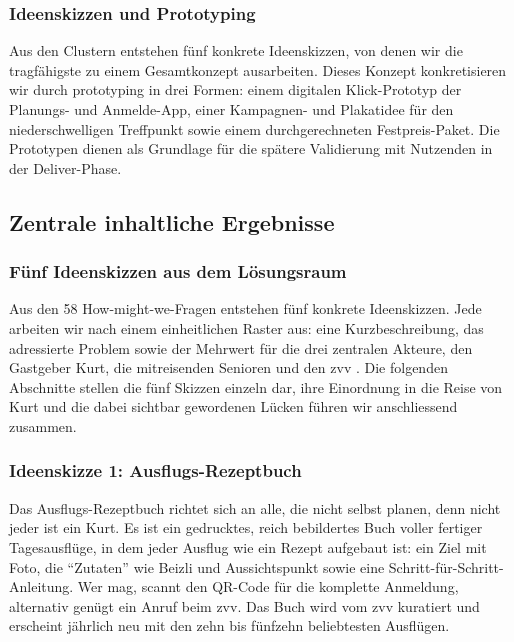 \subsubsection{Ideenskizzen und Prototyping}
Aus den Clustern entstehen fünf konkrete Ideenskizzen, von denen wir die tragfähigste zu einem Gesamtkonzept ausarbeiten. Dieses Konzept konkretisieren wir durch \gls{prototyping} in drei Formen: einem digitalen Klick-Prototyp der Planungs- und Anmelde-App, einer Kampagnen- und Plakatidee für den niederschwelligen Treffpunkt sowie einem durchgerechneten Festpreis-Paket. Die Prototypen dienen als Grundlage für die spätere Validierung mit Nutzenden in der Deliver-Phase.

\newpage
\subsection{Zentrale inhaltliche Ergebnisse}

\subsubsection{Fünf Ideenskizzen aus dem Lösungsraum}
Aus den 58 How-might-we-Fragen entstehen fünf konkrete Ideenskizzen. Jede arbeiten wir nach einem einheitlichen Raster aus: eine Kurzbeschreibung, das adressierte Problem sowie der Mehrwert für die drei zentralen Akteure, den Gastgeber Kurt, die mitreisenden Senioren und den \gls{zvv} \parencite{casaisd2026ideation}. Die folgenden Abschnitte stellen die fünf Skizzen einzeln dar, ihre Einordnung in die Reise von Kurt und die dabei sichtbar gewordenen Lücken führen wir anschliessend zusammen.

\subsubsection{Ideenskizze 1: Ausflugs-Rezeptbuch}
Das Ausflugs-Rezeptbuch richtet sich an alle, die nicht selbst planen, denn nicht jeder ist ein Kurt. Es ist ein gedrucktes, reich bebildertes Buch voller fertiger Tagesausflüge, in dem jeder Ausflug wie ein Rezept aufgebaut ist: ein Ziel mit Foto, die \enquote{Zutaten} wie Beizli und Aussichtspunkt sowie eine Schritt-für-Schritt-Anleitung. Wer mag, scannt den QR-Code für die komplette Anmeldung, alternativ genügt ein Anruf beim \gls{zvv}. Das Buch wird vom \gls{zvv} kuratiert und erscheint jährlich neu mit den zehn bis fünfzehn beliebtesten Ausflügen.

